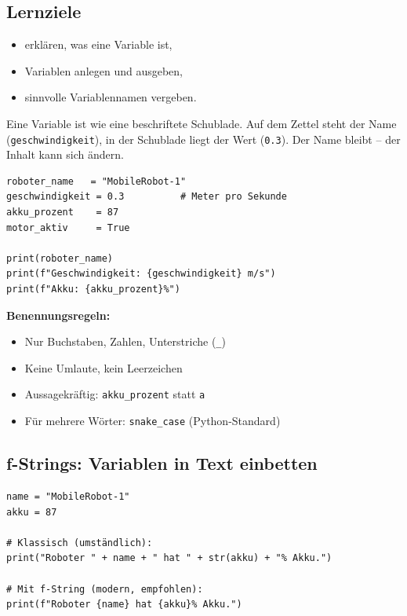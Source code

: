 \subsection*{Lernziele}
\begin{itemize}
    \item erklären, was eine Variable ist,
    \item Variablen anlegen und ausgeben,
    \item sinnvolle Variablennamen vergeben.
\end{itemize}

\begin{analogie}
Eine Variable ist wie eine beschriftete Schublade. Auf dem Zettel steht der Name (\texttt{geschwindigkeit}), in der Schublade liegt der Wert (\texttt{0.3}). Der Name bleibt -- der Inhalt kann sich ändern.
\end{analogie}

\begin{lstlisting}
roboter_name   = "MobileRobot-1"
geschwindigkeit = 0.3          # Meter pro Sekunde
akku_prozent    = 87
motor_aktiv     = True

print(roboter_name)
print(f"Geschwindigkeit: {geschwindigkeit} m/s")
print(f"Akku: {akku_prozent}%")
\end{lstlisting}

\begin{merksatz}
\textbf{Benennungsregeln:}
\begin{itemize}
    \item Nur Buchstaben, Zahlen, Unterstriche (\texttt{\_})
    \item Keine Umlaute, kein Leerzeichen
    \item Aussagekräftig: \texttt{akku\_prozent} statt \texttt{a}
    \item Für mehrere Wörter: \texttt{snake\_case} (Python-Standard)
\end{itemize}
\end{merksatz}

\subsection*{f-Strings: Variablen in Text einbetten}

\begin{lstlisting}
name = "MobileRobot-1"
akku = 87

# Klassisch (umständlich):
print("Roboter " + name + " hat " + str(akku) + "% Akku.")

# Mit f-String (modern, empfohlen):
print(f"Roboter {name} hat {akku}% Akku.")
\end{lstlisting}

